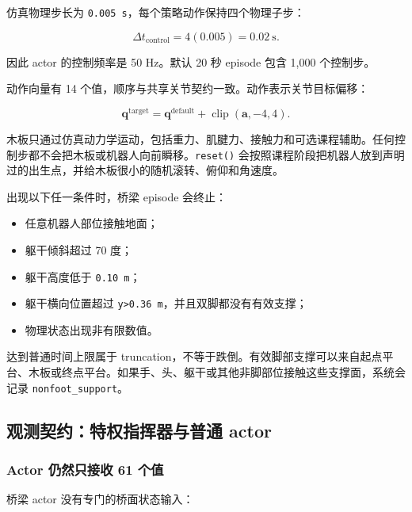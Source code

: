 \documentclass[
  chinese,
  11pt,
  letterpaper,
]{article}
\providecommand{\tightlist}{%
  \setlength{\itemsep}{0pt}\setlength{\parskip}{0pt}}
\begin{document}
仿真物理步长为 \texttt{0.005\ s}，每个策略动作保持四个物理子步：

\[
\Delta t_{\text{control}}=4(0.005)=0.02\ \text{s}.
\]

因此 actor 的控制频率是 50 Hz。默认 20 秒 episode 包含 1,000 个控制步。

动作向量有 14 个值，顺序与共享关节契约一致。动作表示关节目标偏移：

\[
\mathbf q^{\text{target}}
=\mathbf q^{\text{default}}+\operatorname{clip}(\mathbf a,-4,4).
\]

木板只通过仿真动力学运动，包括重力、肌腱力、接触力和可选课程辅助。任何控制步都不会把木板或机器人向前瞬移。\texttt{reset()}
会按照课程阶段把机器人放到声明过的出生点，并给木板很小的随机滚转、俯仰和角速度。

出现以下任一条件时，桥梁 episode 会终止：

\begin{itemize}
\tightlist
\item
  任意机器人部位接触地面；
\item
  躯干倾斜超过 70 度；
\item
  躯干高度低于 \texttt{0.10\ m}；
\item
  躯干横向位置超过
  \texttt{\textbar{}y\textbar{}\textgreater{}0.36\ m}，并且双脚都没有有效支撑；
\item
  物理状态出现非有限数值。
\end{itemize}

达到普通时间上限属于
truncation，不等于跌倒。有效脚部支撑可以来自起点平台、木板或终点平台。如果手、头、躯干或其他非脚部位接触这些支撑面，系统会记录
\texttt{nonfoot\_\allowbreak{}support}。

\subsection{观测契约：特权指挥器与普通
actor}\label{ux89c2ux6d4bux5951ux7ea6ux7279ux6743ux6307ux6325ux5668ux4e0eux666eux901a-actor}

\subsubsection{Actor 仍然只接收 61
个值}\label{actor-ux4ecdux7136ux53eaux63a5ux6536-61-ux4e2aux503c}

桥梁 actor 没有专门的桥面状态输入：
\end{document}
